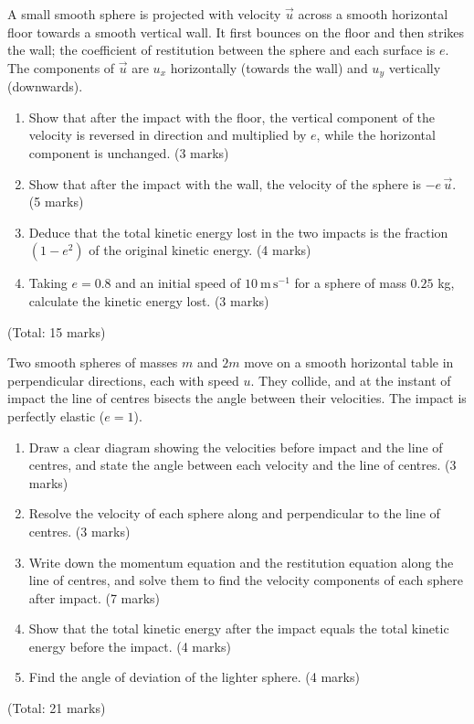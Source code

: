 \documentclass[11pt]{article}
\begin{document}
\begin{exercice}
A small smooth sphere is projected with velocity $\vec{u}$ across a smooth horizontal floor towards a smooth vertical wall. It first bounces on the floor and then strikes the wall; the coefficient of restitution between the sphere and each surface is $e$. The components of $\vec{u}$ are $u_x$ horizontally (towards the wall) and $u_y$ vertically (downwards).
\begin{enumerate}
\item Show that after the impact with the floor, the vertical component of the velocity is reversed in direction and multiplied by $e$, while the horizontal component is unchanged. \hfill(3 marks)
\item Show that after the impact with the wall, the velocity of the sphere is $-e\,\vec{u}$. \hfill(5 marks)
\item Deduce that the total kinetic energy lost in the two impacts is the fraction $(1-e^{2})$ of the original kinetic energy. \hfill(4 marks)
\item Taking $e=0.8$ and an initial speed of $10\ \mathrm{m\,s^{-1}}$ for a sphere of mass $0.25$ kg, calculate the kinetic energy lost. \hfill(3 marks)
\end{enumerate}
\hfill(Total: 15 marks)
\end{exercice}

\begin{exercice}
Two smooth spheres of masses $m$ and $2m$ move on a smooth horizontal table in perpendicular directions, each with speed $u$. They collide, and at the instant of impact the line of centres bisects the angle between their velocities. The impact is perfectly elastic ($e=1$).
\begin{enumerate}
\item Draw a clear diagram showing the velocities before impact and the line of centres, and state the angle between each velocity and the line of centres. \hfill(3 marks)
\item Resolve the velocity of each sphere along and perpendicular to the line of centres. \hfill(3 marks)
\item Write down the momentum equation and the restitution equation along the line of centres, and solve them to find the velocity components of each sphere after impact. \hfill(7 marks)
\item Show that the total kinetic energy after the impact equals the total kinetic energy before the impact. \hfill(4 marks)
\item Find the angle of deviation of the lighter sphere. \hfill(4 marks)
\end{enumerate}
\hfill(Total: 21 marks)
\end{exercice}
\end{document}
